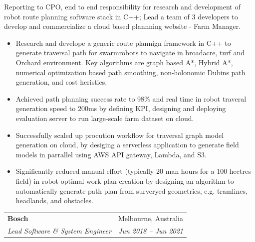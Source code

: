 \documentclass[letterpaper,11pt]{article}
\makeatletter
\newcommand{\resumeItemNoBullet}[4]{
  \vspace{-1pt}
    \begin{tabular*}{0.97\textwidth}{l@{\extracolsep{\fill}}r}
      \textbf{#1} & #2 \\
      \textit{\small#3} & \textit{\small #4} \\
    \end{tabular*}\vspace{-7pt}
}
\newcommand{\resumeSubHeadingListStart}{\begin{itemize}[leftmargin=*]}
\newcommand{\resumeSubHeadingListEnd}{\end{itemize}}
\makeatother
\begin{document}
\vspace{10pt}
{Reporting to CPO, end to end responsibility for research and development of robot route planning software stack in C++; Lead a team of 3 developers to develop and commercialize a cloud based plannning website - Farm Manager. }
  \resumeSubHeadingListStart
    \item Research and develope a generic route plannign framework in C++ to generate traversal path for swarmrobots to navigate in broadacre, turf and Orchard environment. Key algorithms are graph based A*, Hybrid A*, numerical optimization based path smoothing, non-holonomic Dubins path generation, and cost heristics.
    \item Achieved path planning success rate to 98\% and real time in robot traveral generation speed to 200ms by defining KPI, designing and deploying evaluation server to run large-scale farm dataset on cloud. 
    \item Successfully scaled up procution workflow for traversal graph model generation on cloud, by desiging a serverless application to generate field models in parrallel using AWS API gateway, Lambda, and S3.
    \item Significantly reduced manual effort (typically 20 man hours for a 100 hectres field) in robot optimal work plan creation by designing an algorithm to automatically generate path plan from surveryed geometries, e.g. tramlines, headlands, and obstacles.
  \resumeSubHeadingListEnd

\resumeItemNoBullet
{Bosch}{Melbourne, Australia}
{Lead Software \& System Engineer}{Jun 2018 -- Jun 2021}
\end{document}
